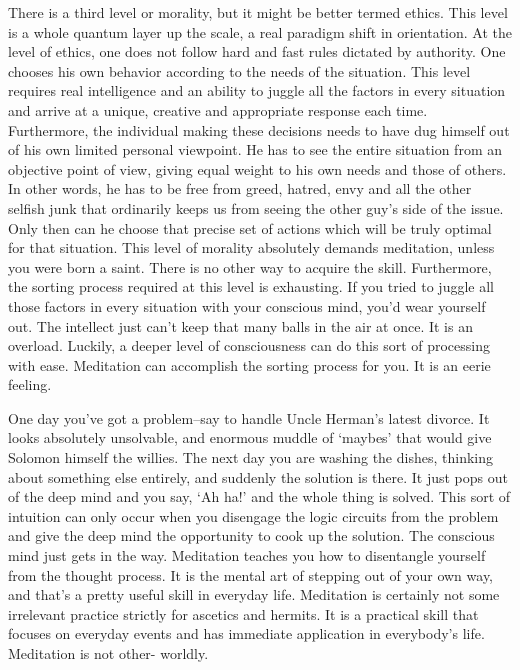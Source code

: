 There is a third level or morality, but it might be better termed ethics. This
level is a whole quantum layer up the scale, a real paradigm shift in
orientation. At the level of ethics, one does not follow hard and fast rules
dictated by authority. One chooses his own behavior according to the needs of
the situation. This level requires real intelligence and an ability to juggle
all the factors in every situation and arrive at a unique, creative and
appropriate response each time. Furthermore, the individual making these
decisions needs to have dug himself out of his own limited personal viewpoint.
He has to see the entire situation from an objective point of view, giving equal
weight to his own needs and those of others. In other words, he has to be free
from greed, hatred, envy and all the other selfish junk that ordinarily keeps us
from seeing the other guy's side of the issue. Only then can he choose that
precise set of actions which will be truly optimal for that situation. This
level of morality absolutely demands meditation, unless you were born a saint.
There is no other way to acquire the skill. Furthermore, the sorting process
required at this level is exhausting. If you tried to juggle all those factors
in every situation with your conscious mind, you'd wear yourself out. The
intellect just can't keep that many balls in the air at once. It is an overload.
Luckily, a deeper level of consciousness can do this sort of processing with
ease. Meditation can accomplish the sorting process for you. It is an eerie
feeling.

One day you've got a problem--say to handle Uncle Herman's latest divorce. It
looks absolutely unsolvable, and enormous muddle of `maybes' that would give
Solomon himself the willies. The next day you are washing the dishes, thinking
about something else entirely, and suddenly the solution is there. It just pops
out of the deep mind and you say, `Ah ha!' and the whole thing is solved.
This sort of intuition can only occur when you disengage the logic circuits from
the problem and give the deep mind the opportunity to cook up the solution. The
conscious mind just gets in the way. Meditation teaches you how to disentangle
yourself from the thought process. It is the mental art of stepping out of your
own way, and that's a pretty useful skill in everyday life. Meditation is
certainly not some irrelevant practice strictly for ascetics and hermits. It is
a practical skill that focuses on everyday events and has immediate application
in everybody's life. Meditation is not other- worldly.

